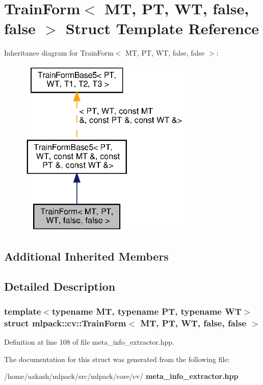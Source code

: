 \section{Train\+Form$<$ MT, PT, WT, false, false $>$ Struct Template Reference}
\label{structmlpack_1_1cv_1_1TrainForm_3_01MT_00_01PT_00_01WT_00_01false_00_01false_01_4}


Inheritance diagram for Train\+Form$<$ MT, PT, WT, false, false $>$\+:
\nopagebreak
\begin{figure}[H]
\begin{center}
\leavevmode
\includegraphics[width=235pt]{structmlpack_1_1cv_1_1TrainForm_3_01MT_00_01PT_00_01WT_00_01false_00_01false_01_4__inherit__graph}
\end{center}
\end{figure}
\subsection*{Additional Inherited Members}


\subsection{Detailed Description}
\subsubsection*{template$<$typename MT, typename PT, typename WT$>$\newline
struct mlpack\+::cv\+::\+Train\+Form$<$ M\+T, P\+T, W\+T, false, false $>$}



Definition at line 108 of file meta\+\_\+info\+\_\+extractor.\+hpp.



The documentation for this struct was generated from the following file\+:\begin{DoxyCompactItemize}
\item 
/home/aakash/mlpack/src/mlpack/core/cv/\textbf{ meta\+\_\+info\+\_\+extractor.\+hpp}\end{DoxyCompactItemize}
